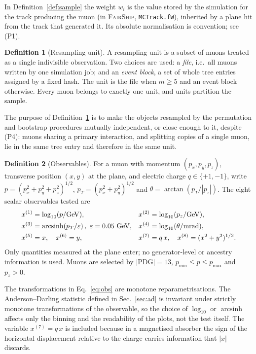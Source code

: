 \documentclass[11pt,a4paper]{article}
\theoremstyle{definition}
\newtheorem{definition}{Definition}[section]
\theoremstyle{plain}
\theoremstyle{remark}
\begin{document}
In Definition~\ref{def:sample} the weight $w_i$ is the value stored by the simulation for the track producing
the muon (in \textsc{FairShip}, \texttt{MCTrack.fW}), inherited by a plane hit
from the track that generated it. Its absolute normalisation is convention; see
(P1).

\begin{definition}[Resampling unit]
\label{def:unit}
A resampling unit is a subset of muons treated as a single indivisible
observation. Two choices are used: a \emph{file}, i.e.\ all muons written by
one simulation job; and an \emph{event block}, a set of whole tree entries
assigned by a fixed hash. The unit is the file when $m \ge 5$ and an event
block otherwise. Every muon belongs to exactly one unit, and units partition
the sample.
\end{definition}

The purpose of Definition~\ref{def:unit} is to make the objects resampled by the
permutation and bootstrap procedures mutually independent, or close enough to
it, despite (P4): muons sharing a primary interaction, and splitting copies of a
single muon, lie in the same tree entry and therefore in the same unit.

\begin{definition}[Observables]
For a muon with momentum $(p_x,p_y,p_z)$, transverse position $(x,y)$ at the
plane, and electric charge $q \in \{+1,-1\}$, write
$p = (p_x^2+p_y^2+p_z^2)^{1/2}$, $p_T = (p_x^2+p_y^2)^{1/2}$ and
$\theta = \arctan\!\left(p_T/|p_z|\right)$. The eight scalar observables tested
are
\begin{align}
  x^{(1)} &= \log_{10}(p/\mathrm{GeV}), &
  x^{(2)} &= \log_{10}(p_z/\mathrm{GeV}), \notag\\
  x^{(3)} &= \operatorname{arcsinh}\!\left(p_T/\varepsilon\right),\
            \varepsilon = 0.05~\mathrm{GeV}, &
  x^{(4)} &= \log_{10}(\theta/\mathrm{mrad}), \notag\\
  x^{(5)} &= x, \quad x^{(6)} = y, &
  x^{(7)} &= q\,x, \quad x^{(8)} = (x^2+y^2)^{1/2}. \label{eq:obs}
\end{align}
Only quantities measured at the plane enter; no generator-level or ancestry
information is used. Muons are selected by $|\mathrm{PDG}| = 13$,
$p_{\min} \le p \le p_{\max}$ and $p_z > 0$.
\end{definition}

The transformations in Eq.~\eqref{eq:obs} are monotone reparametrisations. The
Anderson--Darling statistic defined in Sec.~\ref{sec:ad} is invariant under
strictly monotone transformations of the observable, so the choice of
$\log_{10}$ or $\operatorname{arcsinh}$ affects only the binning and the
readability of the plots, not the test itself. The variable
$x^{(7)} = q\,x$ is included because in a magnetised absorber the sign of the
horizontal displacement relative to the charge carries information that $|x|$
discards.
\end{document}
